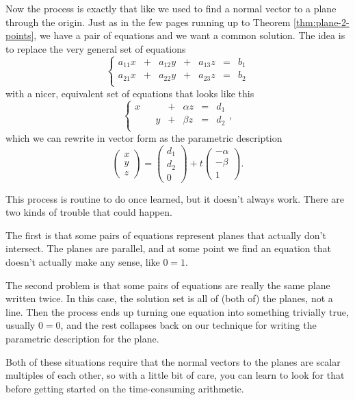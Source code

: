 \documentclass[00-livre-main.tex]{subfiles}
\begin{document}
Now the process is exactly that like we used to find a normal vector to a plane through the origin. Just as in the few pages running up to Theorem \ref{thm:plane-2-points}, we have a pair of equations and we want a common solution. The idea is to replace the very general set of equations 
\[
\left\{\begin{array}{rrrrrrr}
a_{11} x &+& a_{12}y &+& a_{13} z &=& b_1 \\
a_{21} x &+& a_{22}y &+& a_{23} z &=& b_2 \\
\end{array}\right.
\]
with a nicer, equivalent set of equations that looks like this
\[
\left\{\begin{array}{rrrrrrr}
x &&  &+& \alpha z &=& d_1 \\
 && y &+& \beta z &=& d_2 \\
\end{array}\right. ,
\]
which we can rewrite in vector form as the parametric description
\[
\begin{pmatrix} x \\ y \\ z \end{pmatrix} = 
\begin{pmatrix} d_1 \\ d_2 \\ 0 \end{pmatrix} + 
t \begin{pmatrix} -\alpha \\ -\beta \\ 1 \end{pmatrix} .
\]

This process is routine to do once learned, but it doesn't always work. There are two kinds of trouble that could happen. 

The first is that some pairs of equations represent planes that actually don't intersect. The planes are parallel, and at some point we find an equation that doesn't actually make any sense, like $0=1$.

The second problem is that some pairs of equations are really the same plane written twice. In this case, the solution set is all of (both of) the planes, not a line. Then the process ends up turning one equation into something trivially true, usually $0=0$, and the rest collapses back on our technique for writing the parametric description for the plane.

Both of these situations require that the normal vectors to the planes are scalar multiples of each other, so with a little bit of care, you can learn to look for that before getting started on the time-consuming arithmetic.
\end{document}
